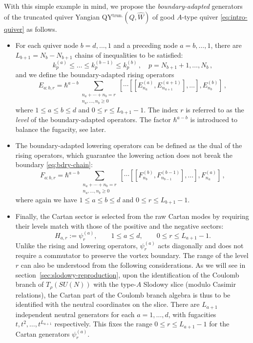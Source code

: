 \documentclass[12pt,a4paper]{article}
\begin{document}
With this simple example in mind, we propose the \textit{boundary-adapted} generators of the truncated quiver Yangian QY$^{\text{trun.}}(\hat{Q},\hat W)$ of good $A$-type quiver \eqref{eq:intro-quiver} as follows.
\begin{itemize}
    \item For each quiver node $b=d,\dots,1$ and a preceding node $a=b,\dots,1$, there are $L_{b+1}=N_b-N_{b+1}$ chains of inequalities to be satisfied:
    \begin{equation}
        k^{(a)}_p  \leq\dots\leq  k^{(b-1)}_p   \leq k^{(b)}_p\,,\quad p=N_{b+1}+1,\dots,N_b\,,
        \label{eq:bdry-chain}
    \end{equation}
    and we define the boundary-adapted rising operators
    \begin{equation}
        E_{a:b,r}=\hbar^{a-b}
 \sum_{\substack{n_a+\cdots+n_b=r\\ n_a,\ldots,n_b\geq0}}
 [\cdots[[E_{n_a}^{(a)},E_{n_{a+1}}^{(a+1)}],\ldots],E_{n_b}^{(b)}]\, ,
 \label{eq:positive-boundary-op}
    \end{equation}
    where $1\leq a\leq b\leq d$ and $0\leq r\leq L_{b+1}-1$. The index $r$ is referred to as the \textit{level} of the boundary-adapted operators. The factor $\hbar^{a-b}$ is introduced to balance the fugacity, see later.

\item The boundary-adapted lowering operators can be defined as the dual of the rising operators, which guarantee the lowering action does not break the boundary \eqref{eq:bdry-chain}:
\begin{equation}
     F_{a:b,r}=\hbar^{a-b}
 \sum_{\substack{n_a+\cdots+n_b=r\\ n_a,\ldots,n_b\geq0}}
 [\cdots[[F_{n_b}^{(b)},F_{n_{b-1}}^{(b-1)}],\ldots],F_{n_a}^{(a)}]\,,
 \label{eq:negative-boundary-op}
\end{equation}
where again we have $1\leq a\leq b\leq d$ and $0\leq r\leq L_{b+1}-1$.

\item Finally, the Cartan sector is selected from the raw Cartan modes by requiring their levels match with those of the positive and the negative sectors:
\begin{equation}
 H_{a,r}:=\psi_r^{(a)},\qquad
 1\leq a\leq d,\qquad 0\leq r\leq L_{a+1}-1.
 \label{eq:boundary-cartan-op}
\end{equation}
Unlike the rising and lowering operators, $\psi_r^{(a)}$ acts diagonally and
does not require a commutator to preserve the vortex boundary.  The range of the level $r$ can also be understood
from the following considerations. As we will see in section~\ref{sec:slodowy-reproduction}, upon the identification of the Coulomb branch of $T_{\rho}(SU(N))$ with the type-$A$ Slodowy slice (modulo Casimir relations), the Cartan part of the Coulomb branch algebra is thus to be identified with the neutral coordinates on the slice. There are $L_{a+1}$ independent neutral generators for each $a=1,\dots,d$, with fugacities $t,t^2,\dots,t^{L_{a+1}}$ respectively. This fixes the range $0\leq r\leq L_{a+1}-1$ for the Cartan generators $\psi^{(a)}_r$.
\end{itemize}
\end{document}
